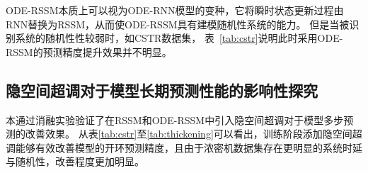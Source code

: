 ODE-RSSM本质上可以视为ODE-RNN模型的变种，它将瞬时状态更新过程由RNN替换为RSSM，从而使ODE-RSSM具有建模随机性系统的能力。
但是当被识别系统的随机性性较弱时，如CSTR数据集， 表~\ref{tab:cstr}说明此时采用ODE-RSSM的预测精度提升效果并不明显。


\subsection{隐空间超调对于模型长期预测性能的影响性探究}
本通过消融实验验证了在RSSM和ODE-RSSM中引入隐空间超调对于模型多步预测的改善效果。
从表\ref{tab:cstr}至\ref{tab:thickening}可以看出，训练阶段添加隐空间超调能够有效改善模型的开环预测精度，且由于浓密机数据集存在更明显的系统时延与随机性，改善程度更加明显。

